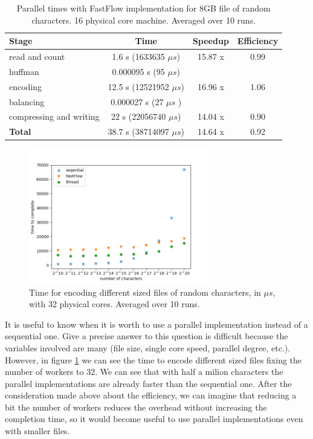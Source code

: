 \documentclass[12pt, letterpaper]{article}
\begin{document}
\begin{table}[h]
    \begin{center}
    \begin{tabular}{l c c c}
        \textbf{Stage} & \textbf{Time} & \textbf{Speedup} & \textbf{Efficiency}  \\
        \hline
        read and count & 1.6 s (1633635 $\mu s$)  & 15.87 x & 0.99  \\
        \hline
        huffman & 0.000095 s (95 $\mu s$) & \\
        \hline
        encoding & 12.5 s (12521952 $\mu s$)  & 16.96 x & 1.06 \\
        \hline
        balancing & 0.000027 s (27 $\mu s$ ) & \\
        \hline
        compressing and writing & 22 s (22056740 $\mu s$)  & 14.04 x & 0.90\\
        \hline
        \textbf{Total} & 38.7 s (38714097 $\mu s$)  & 14.64 x & 0.92 \\ 
\end{tabular} 
\caption{Parallel times with FastFlow implementation for 8GB file of random characters. 16 physical core machine. Averaged over 10 runs.}    
\label{tab:ff_times16}
\end{center}
\end{table}


\begin{figure}
    \centering
    \includegraphics[width=0.7\textwidth]{./images/small._files.png}
    \caption{Time for encoding different sized files of random characters, in $ \mu s$, with 32 physical cores. Averaged over 10 runs.}
    \label{fig:small_files}
\end{figure}

It is useful to know when it is worth to use a parallel implementation instead of a sequential one. Give a precise answer to this question is difficult because the variables involved are many (file size, single core speed, parallel degree, etc.). However, in figure \ref{fig:small_files} we can see the time to encode different sized files fixing the number of workers to 32. We can see that with half a milion characters the parallel implementations are already faster than the sequential one. After the consideration made above about the efficiency, we can imagine that reducing a bit the number of workers reduces the overhead without increasing the completion time, so it would become useful to use parallel implementations even with smaller files.
\end{document}
